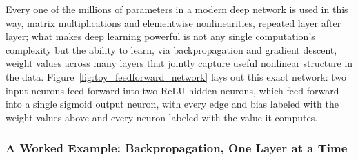 \documentclass[../ai_in_finance]{subfiles}
\begin{document}
Every one of the millions of parameters in a modern deep network is used in this way, matrix multiplications and elementwise nonlinearities, repeated layer after layer; what makes deep learning powerful is not any single computation's complexity but the ability to learn, via backpropagation and gradient descent, weight values across many layers that jointly capture useful nonlinear structure in the data. Figure~\ref{fig:toy_feedforward_network} lays out this exact network: two input neurons feed forward into two ReLU hidden neurons, which feed forward into a single sigmoid output neuron, with every edge and bias labeled with the weight values above and every neuron labeled with the value it computes.

\subsubsection*{A Worked Example: Backpropagation, One Layer at a Time}
\end{document}
